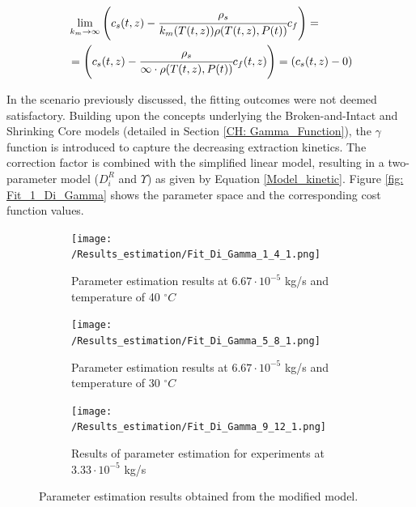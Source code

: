 \documentclass[a4paper,fleqn]{cas-dc}
\begin{document}
{\footnotesize
	\begin{equation*}
		\begin{split}
			&\lim_{k_m \rightarrow \infty} \left({\color{black}{\color{black} c_s} }(t,z)  - \cfrac{{\color{black}\rho_s}}{{\color{black}k_m}(T(t,z)){\color{black}\rho}(T(t,z),{\color{black}P}(t))}  c_f \right)  = \\
			&= \left({\color{black}{\color{black} c_s} }(t,z)  - \cfrac{\rho_s}{\infty \cdot \rho(T(t,z),P(t))}  {c_f}(t,z) \right) = \left(c_s(t,z) - 0 \right)
		\end{split}
\end{equation*} }

In the scenario previously discussed, the fitting outcomes were not deemed satisfactory. Building upon the concepts underlying the Broken-and-Intact and Shrinking Core models (detailed in Section \ref{CH: Gamma_Function}), the $\gamma$ function is introduced to capture the decreasing extraction kinetics. The correction factor is combined with the simplified linear model, resulting in a two-parameter model ($D_i^R$ and $\Upsilon$) as given by Equation \ref{Model_kinetic}. Figure \ref{fig: Fit_1_Di_Gamma} shows the parameter space and the corresponding cost function values.

\begin{figure}[!h]
	\centering
	\begin{subfigure}{0.92\columnwidth}
		\centering
		\texttt{[image: /Results\_estimation/Fit\_Di\_Gamma\_1\_4\_1.png]}
		\caption{Parameter estimation results at $6.67\cdot 10^{-5}$ kg/s and temperature of 40 $^\circ C$}
		\label{fig: Fit_1_4_Di_Gamma}
	\end{subfigure}
	\hfill
	\begin{subfigure}{0.92\columnwidth}
		\centering
		\texttt{[image: /Results\_estimation/Fit\_Di\_Gamma\_5\_8\_1.png]}
		\caption{Parameter estimation results at $6.67\cdot 10^{-5}$ kg/s and temperature of 30 $^\circ C$}
		\label{fig: Fit_5_8_Di_Gamma}
	\end{subfigure}
	\hfill
	\begin{subfigure}{0.92\columnwidth}
		\centering
		\texttt{[image: /Results\_estimation/Fit\_Di\_Gamma\_9\_12\_1.png]}
		\caption{Results of parameter estimation for experiments at $3.33\cdot 10^{-5}$ kg/s}
		\label{fig: Fit_9_12_Di_Gamma}
	\end{subfigure}
	\caption{Parameter estimation results obtained from the modified model.}
	\label{fig: Fit_Di_Gamma}
\end{figure}
\end{document}
